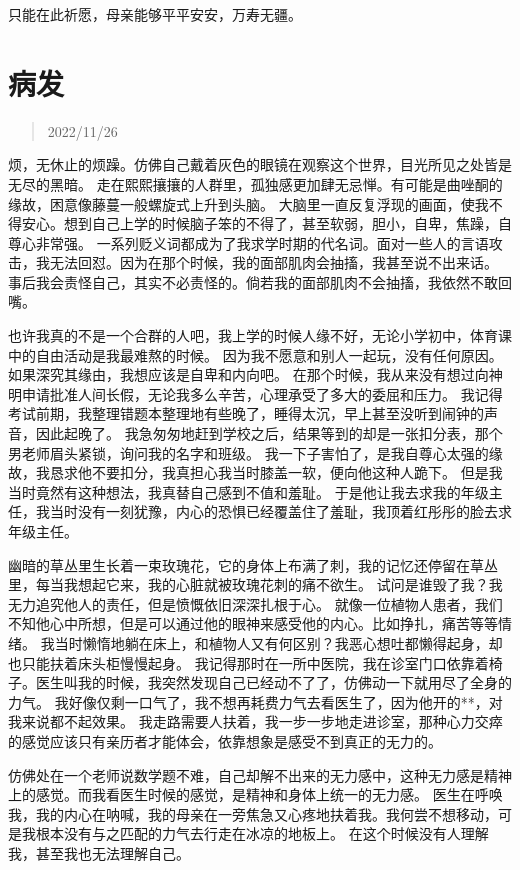 \documentclass[cn,12pt]{elegantbook}
\begin{document}
只能在此祈愿，母亲能够平平安安，万寿无疆。

\newpage
\section{病发}
\begin{quotation}
  2022/11/26
\end{quotation}

烦，无休止的烦躁。仿佛自己戴着灰色的眼镜在观察这个世界，目光所见之处皆是无尽的黑暗。
走在熙熙攘攘的人群里，孤独感更加肆无忌惮。有可能是曲唑酮的缘故，困意像藤蔓一般螺旋式上升到头脑。
大脑里一直反复浮现的画面，使我不得安心。想到自己上学的时候脑子笨的不得了，甚至软弱，胆小，自卑，焦躁，自尊心非常强。
一系列贬义词都成为了我求学时期的代名词。面对一些人的言语攻击，我无法回怼。因为在那个时候，我的面部肌肉会抽搐，我甚至说不出来话。
事后我会责怪自己，其实不必责怪的。倘若我的面部肌肉不会抽搐，我依然不敢回嘴。

也许我真的不是一个合群的人吧，我上学的时候人缘不好，无论小学初中，体育课中的自由活动是我最难熬的时候。
因为我不愿意和别人一起玩，没有任何原因。如果深究其缘由，我想应该是自卑和内向吧。
在那个时候，我从来没有想过向神明申请批准人间长假，无论我多么辛苦，心理承受了多大的委屈和压力。
我记得考试前期，我整理错题本整理地有些晚了，睡得太沉，早上甚至没听到闹钟的声音，因此起晚了。
我急匆匆地赶到学校之后，结果等到的却是一张扣分表，那个男老师眉头紧锁，询问我的名字和班级。
我一下子害怕了，是我自尊心太强的缘故，我恳求他不要扣分，我真担心我当时膝盖一软，便向他这种人跪下。
但是我当时竟然有这种想法，我真替自己感到不值和羞耻。
于是他让我去求我的年级主任，我当时没有一刻犹豫，内心的恐惧已经覆盖住了羞耻，我顶着红彤彤的脸去求年级主任。

幽暗的草丛里生长着一束玫瑰花，它的身体上布满了刺，我的记忆还停留在草丛里，每当我想起它来，我的心脏就被玫瑰花刺的痛不欲生。
试问是谁毁了我？我无力追究他人的责任，但是愤慨依旧深深扎根于心。
就像一位植物人患者，我们不知他心中所想，但是可以通过他的眼神来感受他的内心。比如挣扎，痛苦等等情绪。
我当时懒惰地躺在床上，和植物人又有何区别？我恶心想吐都懒得起身，却也只能扶着床头柜慢慢起身。
我记得那时在一所中医院，我在诊室门口依靠着椅子。医生叫我的时候，我突然发现自己已经动不了了，仿佛动一下就用尽了全身的力气。
我好像仅剩一口气了，我不想再耗费力气去看医生了，因为他开的**，对我来说都不起效果。
我走路需要人扶着，我一步一步地走进诊室，那种心力交瘁的感觉应该只有亲历者才能体会，依靠想象是感受不到真正的无力的。

仿佛处在一个老师说数学题不难，自己却解不出来的无力感中，这种无力感是精神上的感觉。而我看医生时候的感觉，是精神和身体上统一的无力感。
医生在呼唤我，我的内心在呐喊，我的母亲在一旁焦急又心疼地扶着我。我何尝不想移动，可是我根本没有与之匹配的力气去行走在冰凉的地板上。
在这个时候没有人理解我，甚至我也无法理解自己。
\end{document}
